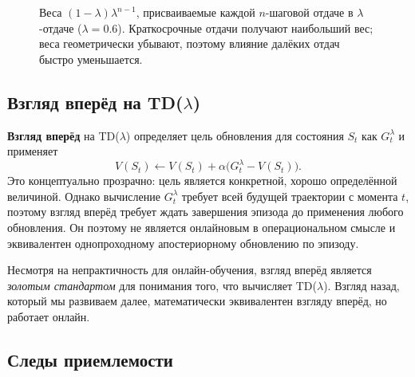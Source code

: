 \begin{figure}[ht]
\centering
{}
\caption{Веса $(1-\lambda)\lambda^{n-1}$, присваиваемые каждой $n$-шаговой отдаче в $\lambda$-отдаче ($\lambda=0.6$).  Краткосрочные отдачи получают наибольший вес; веса геометрически убывают, поэтому влияние далёких отдач быстро уменьшается.}
\label{fig:lambda-weights}
\end{figure}

\subsection{Взгляд вперёд на TD($\lambda$)}
\label{subsec:forward-view}

\textbf{Взгляд вперёд} на TD($\lambda$) определяет цель обновления для состояния $S_t$ как $G_t^\lambda$ и применяет
\[
V(S_t) \leftarrow V(S_t) + \alpha\bigl(G_t^\lambda - V(S_t)\bigr).
\]
Это концептуально прозрачно: цель является конкретной, хорошо определённой величиной.  Однако вычисление $G_t^\lambda$ требует всей будущей траектории с момента $t$, поэтому взгляд вперёд требует ждать завершения эпизода до применения любого обновления.  Он поэтому не является онлайновым в операциональном смысле и эквивалентен однопроходному апостериорному обновлению по эпизоду.

Несмотря на непрактичность для онлайн-обучения, взгляд вперёд является \emph{золотым стандартом} для понимания того, что вычисляет TD($\lambda$).  Взгляд назад, который мы развиваем далее, математически эквивалентен взгляду вперёд, но работает онлайн.

\subsection{Следы приемлемости}
\label{subsec:eligibility-traces}

